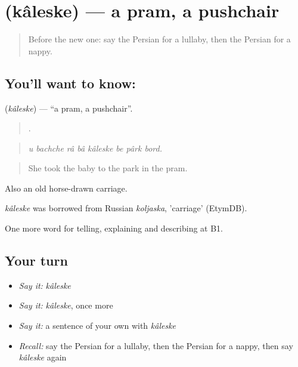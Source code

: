 \section[\texorpdfstring{\fa{کالسکه} (kâleske)}{کالسکه (kâleske)}]{ (kâleske) — a pram, a pushchair}

\label{lesson:FA-C502-kaleske}



\begin{quote}
Before the new one: say the Persian for a lullaby, then the Persian for a nappy.
\end{quote}

\subsection*{You'll want to know: }
\textbf{} (\emph{kâleske}) — \textquotedblleft{}a pram, a pushchair\textquotedblright{}.

\begin{quote}
       .
\end{quote}

\begin{quote}
\emph{u bachche râ bâ kâleske be pârk bord.}
\end{quote}

\begin{quote}
She took the baby to the park in the pram.
\end{quote}

Also an old horse-drawn carriage.

\begin{cousinweb}
\emph{kâleske} was borrowed from Russian \emph{koljaska}, 'carriage' (EtymDB).
\end{cousinweb}

\begin{grammarlens}[title={What you've built}]
One more word for telling, explaining and describing at B1.
\end{grammarlens}

\subsection*{Your turn}
\begin{itemize}
\raggedright
  \item \emph{Say it:} \emph{kâleske}
  \item \emph{Say it:} \emph{kâleske}, once more
  \item \emph{Say it:} a sentence of your own with \emph{kâleske}
  \item \emph{Recall:} say the Persian for a lullaby, then the Persian for a nappy, then say \emph{kâleske} again
\end{itemize}

